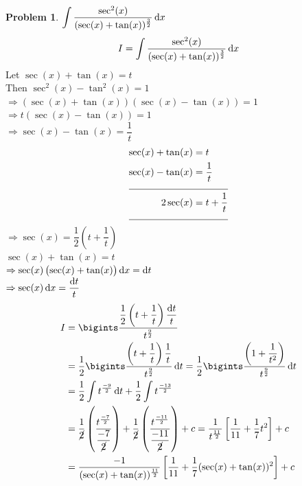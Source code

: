 \documentclass[14]{article}
\theoremstyle{definition}
\newtheorem{prob}{Problem}
\theoremstyle{case}
\begin{document}
\begin{prob}
$\displaystyle \int\dfrac{\sec^2(x)}{(\sec(x) + \tan(x))^{\frac32}} \dif x$
\[I = \int \dfrac{\sec^2(x)}{(\sec(x) + \tan(x))^{\frac32}} \dif x\]
Let $\sec(x) + \tan(x) = t$\\
Then $\sec^2(x) - \tan^2(x) = 1$\\
$\Rightarrow \left(\sec(x) + \tan(x) \right)\left( \sec(x) - \tan(x) \right) = 1$\\
$\Rightarrow t\left( \sec(x) - \tan(x) \right) = 1$\\
$\Rightarrow \sec(x) - \tan(x) = \dfrac1t$
\begin{align*}
\sec(x) + \tan(x) &= t\\
\sec(x) - \tan(x) &= \dfrac1t\\
\cline{1-2}
2\sec(x) &= t + \dfrac1t\\
\cline{1-2}
\end{align*}
$\Rightarrow \sec(x) = \dfrac12 \left(t + \dfrac1t\right)$\\
$\sec(x) + \tan(x) = t$\\
$\Rightarrow \sec(x) \left( \sec(x) + \tan(x) \right)\dif x = \dif t$\\
$\Rightarrow \sec(x) \dif x = \dfrac{\dif t}{t}$
\begin{align*}
I &= \bigints \dfrac{\dfrac12 \left( t + \dfrac1t \right) \dfrac{\dif t}{t}}{t^{\frac92}}\\
&=\dfrac12 \bigints \dfrac{ \left( t + \dfrac1t \right) \dfrac{1}{t}}{t^{\frac92}} \dif t =\dfrac12 \bigints \dfrac{ \left( 1 + \dfrac1{t^2} \right)}{t^{\frac92}} \dif t\\
&= \dfrac12 \int t^{\frac{-9}{2}}\dif t + \dfrac12 \int t^{\frac{-13}{2}}\\
&= \dfrac1{\cancel{2}} \left( \dfrac{t^{\frac{-7}{2}}}{\dfrac{-7}{\cancel{2}}}\right) + \dfrac1{\cancel{2}} \left( \dfrac{t^{\frac{-11}{2}}}{\dfrac{-11}{\cancel{2}}} \right) + c = \dfrac{1}{t^{\frac{11}{2}}}\left[\dfrac1{11} + \dfrac1{7}t^2 \right] + c\\
&= \dfrac{-1}{(\sec(x) + \tan(x))^{\frac{11}{2}}}\left[\dfrac1{11} + \dfrac1{7}(\sec(x) + \tan(x))^2 \right] + c
\end{align*}
\end{prob}
\pagebreak
\end{document}
